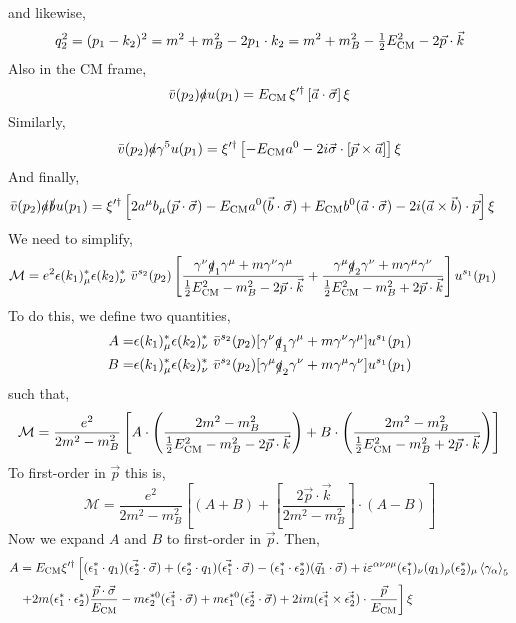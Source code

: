 \documentclass[12pt]{article}
\newcommand{\cM}{\mathcal{M}}
\begin{document}
and likewise,
\[ q_2^2 = (p_1 - k_2)^2 = m^2 + m_B^2 - 2 p_1 \cdot k_2 = m^2 + m_B^2 - \tfrac{1}{2} E_{\mathrm{CM}}^2 - 2 \vec{p} \cdot \vec{k} \]
Also in the CM frame,
\[ \bar{v}(p_2) \slashed{a} u(p_1) = E_{\mathrm{CM}} \, \xi'^{\dagger} \left[ \vec{a} \cdot \vec{\sigma} \right] \xi  \]
Similarly,
\[ \bar{v}(p_2) \slashed{a} \gamma^5 u(p_1) = \xi'^{\dagger} \left[ - E_{\mathrm{CM}} a^0 - 2i \vec{\sigma} \cdot \left[ \vec{p} \times \vec{a} \right] \right] \xi \]
And finally,
\begin{align*}
\bar{v}(p_2) \slashed{a} \slashed{b} u(p_1) = \xi'^{\dagger} & \left[ 2 a^\mu b_\mu  (\vec{p} \cdot \vec{\sigma}) - E_{\mathrm{CM}} a^0 (\vec{b} \cdot \vec{\sigma}) + E_{\mathrm{CM}} b^0 (\vec{a} \cdot \vec{\sigma}) - 2i (\vec{a} \times \vec{b}) \cdot \vec{p} \right] \xi 
\end{align*}
We need to simplify,
\begin{align*}
\cM = e^2 & \epsilon(k_1)^*_{\mu} \epsilon(k_2)^*_{\nu} \, \, \bar{v}^{s_2}(p_2) \left[ \frac{\gamma^\nu \slashed{q}_1 \gamma^\mu + m \gamma^\nu \gamma^\mu}{\tfrac{1}{2} E_{\CM}^2 - m_B^2 - 2 \vec{p} \cdot \vec{k}} + \frac{\gamma^\mu \slashed{q}_2 \gamma^\nu + m \gamma^\mu \gamma^\nu}{\tfrac{1}{2} E_{\CM}^2 - m_B^2 + 2 \vec{p} \cdot \vec{k}} \right] u^{s_1}(p_1)
\end{align*}
To do this, we define two quantities,
\begin{align*}
A = & \epsilon(k_1)^*_{\mu} \epsilon(k_2)^*_{\nu} \, \, \bar{v}^{s_2}(p_2) [ \gamma^\nu \slashed{q}_1 \gamma^\mu + m \gamma^\nu \gamma^\mu] u^{s_1}(p_1)
\\
B = & \epsilon(k_1)^*_{\mu} \epsilon(k_2)^*_{\nu} \, \, \bar{v}^{s_2}(p_2) [ \gamma^\mu \slashed{q}_2 \gamma^\nu + m \gamma^\mu \gamma^\nu] u^{s_1}(p_1)
\end{align*}
such that,
\[ \cM = \frac{e^2}{2m^2 - m_B^2} \left[ A \cdot \left( \frac{2 m^2 - m_B^2}{\tfrac{1}{2} E_{\CM}^2 - m_B^2 - 2 \vec{p} \cdot \vec{k}} \right) + B \cdot \left( \frac{2 m^2 - m_B^2}{\tfrac{1}{2} E_{\CM}^2 - m_B^2 + 2 \vec{p} \cdot \vec{k}} \right) \right]  \]
To first-order in $\vec{p}$ this is,
\[ \cM = \frac{e^2}{2m^2 - m_B^2} \left[ (A + B) + \left[ \frac{2 \vec{p} \cdot \vec{k}}{2 m^2 - m_B^2} \right] \cdot (A - B) \right] \]
Now we expand $A$ and $B$ to first-order in $\vec{p}$. Then,
\begin{align*}
A &= E_{\mathrm{CM}} \xi'^{\dagger} \left[ (\epsilon_1^* \cdot q_1) (\vec{\epsilon^*_2} \cdot \vec{\sigma}) + (\epsilon_2^* \cdot q_1) (\vec{\epsilon^*_1} \cdot \vec{\sigma}) - (\epsilon_1^* \cdot \epsilon_2^*) (\vec{q}_1 \cdot \vec{\sigma}) + i \varepsilon^{\alpha \nu \rho \mu} (\epsilon_1^*)_\nu (q_1)_\rho (\epsilon_2^*)_\mu \left< \gamma_\alpha \right>_5 \right.
\\
& \left. + 2m (\epsilon_1^* \cdot \epsilon_2^*) \frac{\vec{p} \cdot \vec{\sigma}}{E_{\mathrm{CM}}} - m \epsilon^{*0}_2 (\vec{\epsilon^*_1} \cdot \vec{\sigma}) + m \epsilon^{*0}_1 (\vec{\epsilon^*_2} \cdot \vec{\sigma}) + 2i m (\vec{\epsilon^*_1} \times \vec{\epsilon^*_2}) \cdot \frac{\vec{p}}{E_{\mathrm{CM}}}  \right] \xi
\end{align*}
\end{document}
